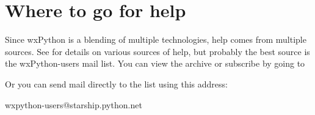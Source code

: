 \section{Where to go for help}\label{wxphelp}

Since wxPython is a blending of multiple technologies, help comes from
multiple sources. See 
 for details on
various sources of help, but probably the best source is the
wxPython-users mail list. You can view the archive or subscribe by
going to


Or you can send mail directly to the list using this address:

wxpython-users@starship.python.net

